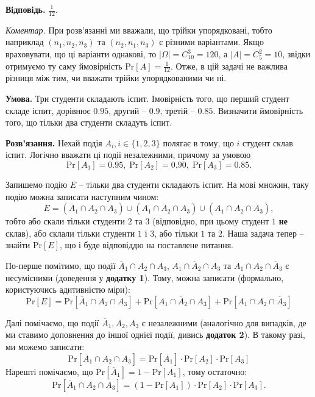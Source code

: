 \documentclass[oneside,solution]{karazin-prob-theory-assign}
\begin{document}
\textbf{Відповідь.} $\frac{1}{12}$.

\textit{Коментар.} При розв'язанні ми вважали, що трійки упорядковані, тобто наприклад $(n_1,n_2,n_3)$ та $(n_2,n_1,n_3)$ є різними варіантами. Якщо враховувати, що ці варіанти однакові, то $|\Omega|=C_{10}^3=120$, а $|A|=C_5^2 = 10$, звідки отримуємо ту саму ймовірність $\text{Pr}[A] = \frac{1}{12}$. Отже, в цій задачі не важлива різниця між тим, чи вважати трійки упорядкованими чи ні. 


\textbf{Умова.} Три студенти складають іспит. Імовірність того, що перший студент складе іспит, дорівнює $0.95$, другий -- $0.9$, третій -- $0.85$. Визначити ймовірність того, що тільки два студенти складуть іспит.

\textbf{Розв'язання.} Нехай подія $A_i, i \in \{1,2,3\}$ полягає в тому, що $i$ студент склав іспит. Логічно вважати ці події незалежними, причому за умовою
\begin{equation}
    \text{Pr}[A_1] = 0.95, \; \text{Pr}[A_2] = 0.90, \; \text{Pr}[A_3] = 0.85.
\end{equation}

Запишемо подію $E$ -- тільки два студенти складають іспит. На мові множин, таку подію можна записати наступним чином:
\begin{equation}
    E = (\overline{A}_1 \cap A_2 \cap A_3) \cup (A_1 \cap \overline{A}_2 \cap A_3) \cup (A_1 \cap A_2 \cap \overline{A}_3),
\end{equation}
тобто або скали тільки студенти $2$ та $3$ (відповідно, при цьому студент $1$ \textbf{не} склав), або склали тільки студенти $1$ і $3$, або тільки $1$ та $2$. Наша задача тепер -- знайти $\text{Pr}[E]$, що і буде відповіддю на поставлене питання. 

По-перше помітимо, що події $\overline{A}_1 \cap A_2 \cap A_3$, $A_1 \cap \overline{A}_2 \cap A_3$ та $A_1 \cap A_2 \cap \overline{A}_3$ є несумісними (доведення у \textbf{додатку 1}). Тому, можна записати (формально, користуючись адитивністю міри):
\begin{equation}
    \text{Pr}[E] = \text{Pr}[\overline{A}_1 \cap A_2 \cap A_3] + \text{Pr}[A_1 \cap \overline{A}_2 \cap A_3] + \text{Pr}[A_1 \cap A_2 \cap \overline{A}_3]
\end{equation}

Далі помічаємо, що події $\overline{A}_1,A_2,A_3$ є незалежними (аналогічно для випадків, де ми ставимо доповнення до іншої однієї події, дивись \textbf{додаток 2}). В такому разі, ми можемо записати:
\begin{equation}
    \text{Pr}[\overline{A}_1 \cap A_2 \cap A_3] = \text{Pr}[\overline{A}_1]\cdot\text{Pr}[A_2]\cdot\text{Pr}[A_3]
\end{equation}
Нарешті помічаємо, що $\text{Pr}[\overline{A}_1] = 1 - \text{Pr}[A_1]$, тому остаточно:
\begin{equation}
    \text{Pr}[\overline{A}_1 \cap A_2 \cap A_3] = (1-\text{Pr}[A_1]) \cdot \text{Pr}[A_2] \cdot \text{Pr}[A_3].
\end{equation}
\end{document}
